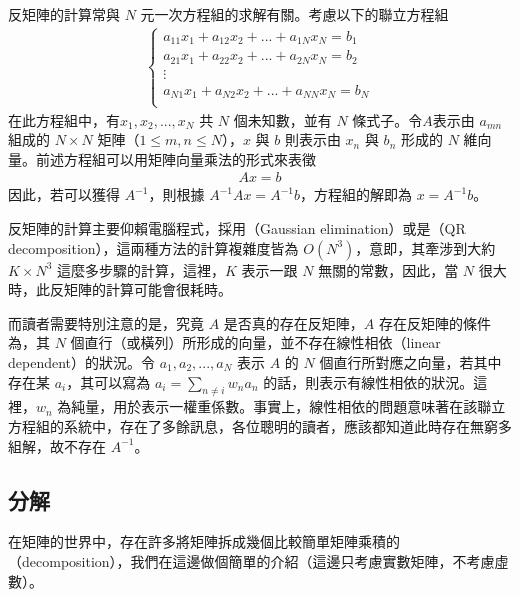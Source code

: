 \documentclass[letterpaper,10pt,english]{sphinxmanual}
\begin{document}
反矩陣的計算常與 \(N\) 元一次方程組的求解有關。考慮以下的聯立方程組
\begin{equation*}
\begin{split}
\begin{cases}
a_{11} x_1 + a_{12} x_2 + ... + a_{1N} x_N = b_1 \\
a_{21} x_1 + a_{22} x_2 + ... + a_{2N} x_N = b_2 \\
\vdots \\
a_{N1} x_1 + a_{N2} x_2 + ... + a_{NN} x_N = b_N \\
\end{cases}
\end{split}
\end{equation*}
在此方程組中，有\(x_1, x_2,...,x_N\) 共 \(N\) 個未知數，並有 \(N\) 條式子。令\(A\)表示由 \(a_{mn}\)組成的 \(N \times N\) 矩陣（\(1 \leq m,n\leq N\)），\(x\) 與 \(b\) 則表示由 \(x_n\) 與 \(b_n\) 形成的 \(N\) 維向量。前述方程組可以用矩陣向量乘法的形式來表徵
\begin{equation*}
\begin{split}
Ax=b
\end{split}
\end{equation*}
因此，若可以獲得 \(A^{-1}\)，則根據 \(A^{-1}Ax=A^{-1}b\)，方程組的解即為 \(x=A^{-1}b\)。

反矩陣的計算主要仰賴電腦程式，採用（Gaussian elimination）或是（QR decomposition），這兩種方法的計算複雜度皆為 \(O(N^3)\)，意即，其牽涉到大約 \(K \times N^3\) 這麼多步驟的計算，這裡，\(K\) 表示一跟 \(N\) 無關的常數，因此，當 \(N\) 很大時，此反矩陣的計算可能會很耗時。

而讀者需要特別注意的是，究竟 \(A\) 是否真的存在反矩陣，\(A\) 存在反矩陣的條件為，其 \(N\) 個直行（或橫列）所形成的向量，並不存在線性相依（linear dependent）的狀況。令 \(a_1, a_2, ..., a_N\) 表示 \(A\) 的 \(N\) 個直行所對應之向量，若其中存在某 \(a_i\)，其可以寫為 \(a_i = \sum_{n \neq i} w_n a_n\) 的話，則表示有線性相依的狀況。這裡，\(w_n\) 為純量，用於表示一權重係數。事實上，線性相依的問題意味著在該聯立方程組的系統中，存在了多餘訊息，各位聰明的讀者，應該都知道此時存在無窮多組解，故不存在 \(A^{-1}\)。


\subsection{分解}
\label{\detokenize{notebook/mathematics-prerequisite:id10}}
在矩陣的世界中，存在許多將矩陣拆成幾個比較簡單矩陣乘積的（decomposition），我們在這邊做個簡單的介紹（這邊只考慮實數矩陣，不考慮虛數）。
\end{document}
